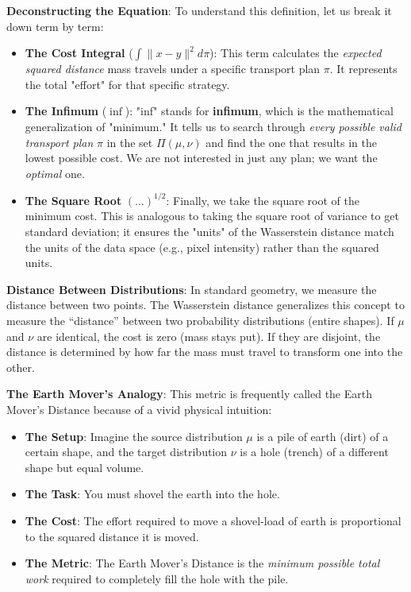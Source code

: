 \documentclass{book}
\begin{document}
\textbf{Deconstructing the Equation}:
To understand this definition, let us break it down term by term:
\begin{itemize}
    \item \textbf{The Cost Integral} ($\int \|x - y\|^2 d\pi$): This term calculates the \textit{expected squared distance} mass travels under a specific transport plan $\pi$. It represents the total "effort" for that specific strategy.
    \item \textbf{The Infimum} ($\inf$): "inf" stands for \textbf{infimum}, which is the mathematical generalization of "minimum." It tells us to search through \textit{every possible valid transport plan} $\pi$ in the set $\Pi(\mu, \nu)$ and find the one that results in the lowest possible cost. We are not interested in just any plan; we want the \textit{optimal} one.
    \item \textbf{The Square Root} $(\dots)^{1/2}$: Finally, we take the square root of the minimum cost. This is analogous to taking the square root of variance to get standard deviation; it ensures the "units" of the Wasserstein distance match the units of the data space (e.g., pixel intensity) rather than the squared units.
\end{itemize}

\textbf{Distance Between Distributions}:
In standard geometry, we measure the distance between two points. The Wasserstein distance generalizes this concept to measure the ``distance'' between two probability distributions (entire shapes). If $\mu$ and $\nu$ are identical, the cost is zero (mass stays put). If they are disjoint, the distance is determined by how far the mass must travel to transform one into the other.

\textbf{The Earth Mover's Analogy}:
This metric is frequently called the Earth Mover's Distance because of a vivid physical intuition:
\begin{itemize}
    \item \textbf{The Setup}: Imagine the source distribution $\mu$ is a pile of earth (dirt) of a certain shape, and the target distribution $\nu$ is a hole (trench) of a different shape but equal volume.
    \item \textbf{The Task}: You must shovel the earth into the hole.
    \item \textbf{The Cost}: The effort required to move a shovel-load of earth is proportional to the squared distance it is moved.
    \item \textbf{The Metric}: The Earth Mover's Distance is the \textit{minimum possible total work} required to completely fill the hole with the pile.
\end{itemize}
\end{document}
